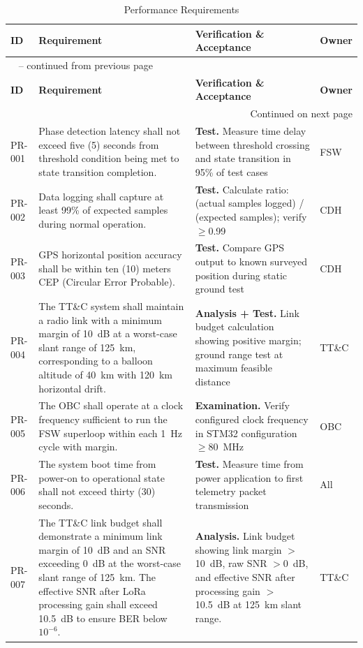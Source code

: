 \begin{landscape}
\begin{longtable}{p{1.4cm}p{8.2cm}p{10.2cm}p{1.9cm}}
\caption{Performance Requirements}
\label{tab:req-performance} \\
\toprule
\textbf{ID} & \textbf{Requirement} & \textbf{Verification \& Acceptance} & \textbf{Owner} \\
\midrule
\endfirsthead
\multicolumn{4}{l}{\tablename\ \thetable{} -- continued from previous page} \\
\toprule
\textbf{ID} & \textbf{Requirement} & \textbf{Verification \& Acceptance} & \textbf{Owner} \\
\midrule
\endhead
\midrule
\multicolumn{4}{r}{Continued on next page} \\
\endfoot
\bottomrule
\endlastfoot

PR-001 & Phase detection latency shall not exceed five (5) seconds from threshold condition being met to state transition completion. & \textbf{Test.} Measure time delay between threshold crossing and state transition in 95\% of test cases & FSW \\
PR-002 & Data logging shall capture at least 99\% of expected samples during normal operation. & \textbf{Test.} Calculate ratio: (actual samples logged) / (expected samples); verify $\geq$0.99 & CDH \\
PR-003 & GPS horizontal position accuracy shall be within ten (10) meters CEP (Circular Error Probable). & \textbf{Test.} Compare GPS output to known surveyed position during static ground test & CDH \\
PR-004 & The TT\&C system shall maintain a radio link with a minimum margin of 10~dB at a worst-case slant range of 125~km, corresponding to a balloon altitude of 40~km with 120~km horizontal drift. & \textbf{Analysis + Test.} Link budget calculation showing positive margin; ground range test at maximum feasible distance & TT\&C \\
PR-005 & The OBC shall operate at a clock frequency sufficient to run the FSW superloop within each 1~Hz cycle with margin. & \textbf{Examination.} Verify configured clock frequency in STM32 configuration $\geq$80~MHz & OBC \\
PR-006 & The system boot time from power-on to operational state shall not exceed thirty (30) seconds. & \textbf{Test.} Measure time from power application to first telemetry packet transmission & All \\
PR-007 & The TT\&C link budget shall demonstrate a minimum link margin of 10~dB and an SNR exceeding 0~dB at the worst-case slant range of 125~km. The effective SNR after LoRa processing gain shall exceed 10.5~dB to ensure BER below $10^{-6}$. & \textbf{Analysis.} Link budget showing link margin $>$10~dB, raw SNR $>$0~dB, and effective SNR after processing gain $>$10.5~dB at 125~km slant range. & TT\&C \\

\end{longtable}
\end{landscape}
